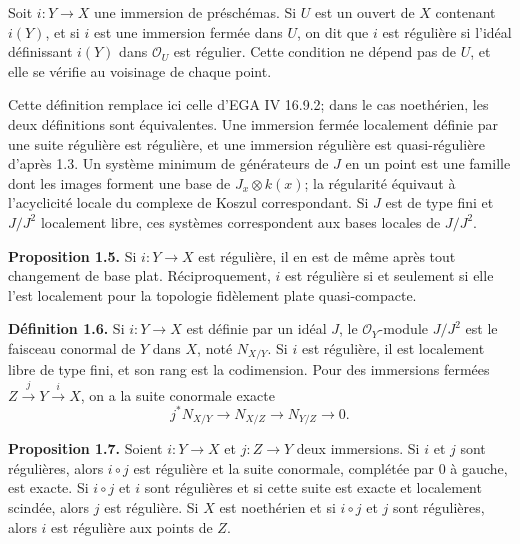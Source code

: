 \documentclass[11pt]{article}
\providecommand{\cO}{\mathcal O}
\begin{document}
Soit \(i:Y\to X\) une immersion de préschémas. Si \(U\) est un ouvert de \(X\) contenant \(i(Y)\), et si \(i\) est une immersion fermée dans \(U\), on dit que \(i\) est régulière si l'idéal définissant \(i(Y)\) dans \(\cO_U\) est régulier. Cette condition ne dépend pas de \(U\), et elle se vérifie au voisinage de chaque point.

Cette définition remplace ici celle d'EGA IV 16.9.2; dans le cas noethérien, les deux définitions sont équivalentes. Une immersion fermée localement définie par une suite régulière est régulière, et une immersion régulière est quasi-régulière d'après 1.3. Un système minimum de générateurs de \(J\) en un point est une famille dont les images forment une base de \(J_x\otimes k(x)\); la régularité équivaut à l'acyclicité locale du complexe de Koszul correspondant. Si \(J\) est de type fini et \(J/J^2\) localement libre, ces systèmes correspondent aux bases locales de \(J/J^2\).

\textbf{Proposition 1.5.} Si \(i:Y\to X\) est régulière, il en est de même après tout changement de base plat. Réciproquement, \(i\) est régulière si et seulement si elle l'est localement pour la topologie fidèlement plate quasi-compacte.

\textbf{Définition 1.6.} Si \(i:Y\to X\) est définie par un idéal \(J\), le \(\cO_Y\)-module \(J/J^2\) est le faisceau conormal de \(Y\) dans \(X\), noté \(N_{X/Y}\). Si \(i\) est régulière, il est localement libre de type fini, et son rang est la codimension. Pour des immersions fermées \(Z\xrightarrow{j}Y\xrightarrow{i}X\), on a la suite conormale exacte
\begin{equation}\tag{1.6.1}
 j^*N_{X/Y}\longrightarrow N_{X/Z}\longrightarrow N_{Y/Z}\longrightarrow0.
\end{equation}

\textbf{Proposition 1.7.} Soient \(i:Y\to X\) et \(j:Z\to Y\) deux immersions. Si \(i\) et \(j\) sont régulières, alors \(i\circ j\) est régulière et la suite conormale, complétée par \(0\) à gauche, est exacte. Si \(i\circ j\) et \(i\) sont régulières et si cette suite est exacte et localement scindée, alors \(j\) est régulière. Si \(X\) est noethérien et si \(i\circ j\) et \(j\) sont régulières, alors \(i\) est régulière aux points de \(Z\).
\end{document}
